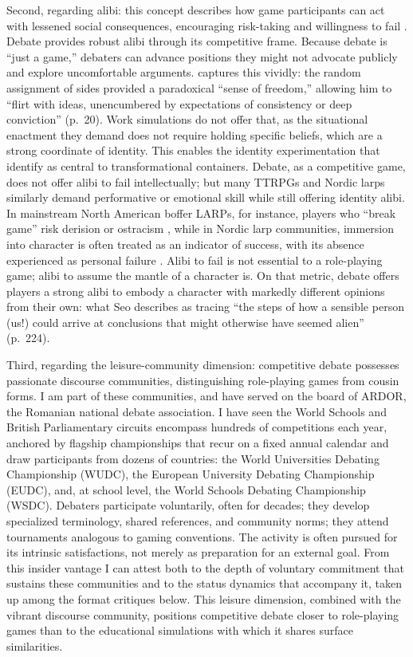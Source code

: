 Second, regarding alibi: this concept describes how game participants can act with lessened social consequences, encouraging risk-taking and willingness to fail \parencite{deterding2017alibis}. Debate provides robust alibi through its competitive frame. Because debate is ``just a game,'' debaters can advance positions they might not advocate publicly and explore uncomfortable arguments. \textcite{seo2022good} captures this vividly: the random assignment of sides provided a paradoxical ``sense of freedom,'' allowing him to ``flirt with ideas, unencumbered by expectations of consistency or deep conviction'' (p.~20). Work simulations do not offer that, as the situational enactment they demand does not require holding specific beliefs, which are a strong coordinate of identity. This enables the identity experimentation that \textcite{bowman2025transformative} identify as central to transformational containers. Debate, as a competitive game, does not offer alibi to fail intellectually; but many TTRPGs and Nordic larps similarly demand performative or emotional skill while still offering identity alibi. In mainstream North American boffer LARPs, for instance, players who ``break game'' risk derision or ostracism \parencite{brown2016culture}, while in Nordic larp communities, immersion into character is often treated as an indicator of success, with its absence experienced as personal failure \parencite{harder2018larp,pohjola2015steering}. Alibi to fail is not essential to a role-playing game; alibi to assume the mantle of a character is. On that metric, debate offers players a strong alibi to embody a character with markedly different opinions from their own: what Seo describes as tracing ``the steps of how a sensible person (us!) could arrive at conclusions that might otherwise have seemed alien'' (p.~224).

Third, regarding the leisure-community dimension: competitive debate possesses passionate discourse communities, distinguishing role-playing games from cousin forms. I am part of these communities, and have served on the board of ARDOR, the Romanian national debate association. I have seen the World Schools and British Parliamentary circuits encompass hundreds of competitions each year, anchored by flagship championships that recur on a fixed annual calendar and draw participants from dozens of countries: the World Universities Debating Championship (WUDC), the European University Debating Championship (EUDC), and, at school level, the World Schools Debating Championship (WSDC). Debaters participate voluntarily, often for decades; they develop specialized terminology, shared references, and community norms; they attend tournaments analogous to gaming conventions. The activity is often pursued for its intrinsic satisfactions, not merely as preparation for an external goal. From this insider vantage I can attest both to the depth of voluntary commitment that sustains these communities and to the status dynamics that accompany it, taken up among the format critiques below. This leisure dimension, combined with the vibrant discourse community, positions competitive debate closer to role-playing games than to the educational simulations with which it shares surface similarities.

